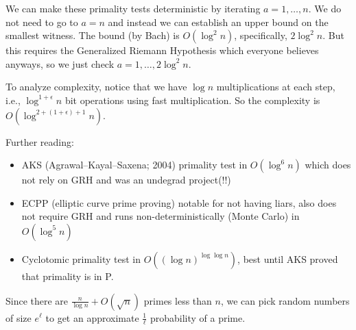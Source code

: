 \documentclass[notes]{agony}
\begin{document}
We can make these primality tests deterministic by iterating $a = 1,\dotsc,n$.
We do not need to go to $a=n$ and instead
we can establish an upper bound on the smallest witness.
The bound (by Bach) is $O(\log^2 n)$, specifically, $2\log^2n$.
But this requires the Generalized Riemann Hypothesis
which everyone believes anyways, so we just check $a = 1,\dotsc,2\log^2 n$.

To analyze complexity, notice that we have $\log n$ multiplications at each step,
i.e., $\log^{1+\epsilon} n$ bit operations using fast multiplication.
So the complexity is $O(\log^{2 + (1 + \epsilon) + 1} n)$.

Further reading:
\begin{itemize}[nosep]
  \item AKS (Agrawal--Kayal--Saxena; 2004) primality test in $O(\log^6 n)$
        which does not rely on GRH and was an undegrad project(!!)
  \item ECPP (elliptic curve prime proving) notable for not having liars,
        also does not require GRH and runs non-deterministically (Monte Carlo)
        in $O(\log^5 n)$
  \item Cyclotomic primality test in $O((\log n)^{\log \log n})$,
        best until AKS proved that primality is in P.
\end{itemize}

Since there are $\frac{n}{\log n} + O(\sqrt n)$ primes less than $n$,
we can pick random numbers of size $e^\ell$ to get an approximate $\frac{1}{\ell}$
probability of a prime.
\end{document}
